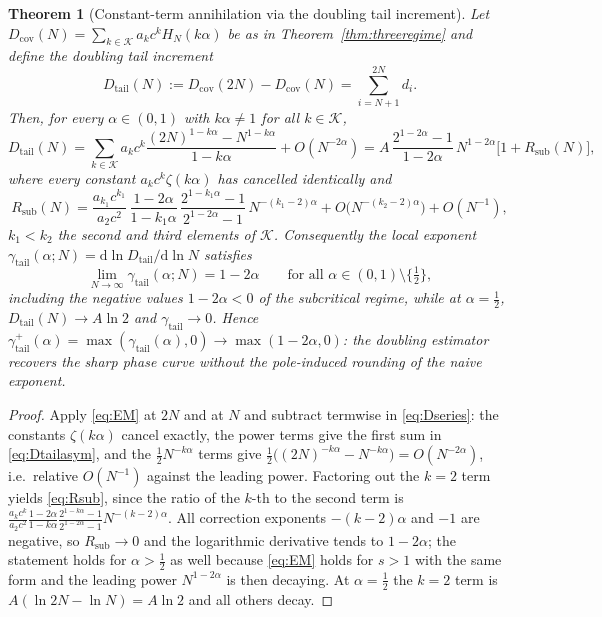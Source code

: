 \documentclass[11pt,reqno]{amsart}
\theoremstyle{plain}
\newtheorem{theorem}{Theorem}[section]
\theoremstyle{definition}
\theoremstyle{remark}
\numberwithin{equation}{section}
\newcommand{\dd}{\mathrm{d}}
\newcommand{\Dcov}{D_{\mathrm{cov}}}
\newcommand{\Dtail}{D_{\mathrm{tail}}}
\newcommand{\gtail}{\gamma_{\mathrm{tail}}}
\begin{document}
\begin{theorem}[Constant-term annihilation via the doubling tail increment]\label{thm:tail}
Let $\Dcov(N)=\sum_{k\in\mathcal K}a_kc^kH_N(k\alpha)$ be as in Theorem~\ref{thm:threeregime} and define the doubling tail increment
\begin{equation}\label{eq:Dtail}
\Dtail(N):=\Dcov(2N)-\Dcov(N)=\sum_{i=N+1}^{2N}d_i .
\end{equation}
Then, for every $\alpha\in(0,1)$ with $k\alpha\ne1$ for all $k\in\mathcal K$,
\begin{equation}\label{eq:Dtailasym}
\Dtail(N)=\sum_{k\in\mathcal K}a_kc^k\frac{(2N)^{1-k\alpha}-N^{1-k\alpha}}{1-k\alpha}+O(N^{-2\alpha})
=A\,\frac{2^{1-2\alpha}-1}{1-2\alpha}\,N^{1-2\alpha}\bigl[1+R_{\mathrm{sub}}(N)\bigr],
\end{equation}
where every constant $a_kc^k\zeta(k\alpha)$ has cancelled identically and
\begin{equation}\label{eq:Rsub}
R_{\mathrm{sub}}(N)=\frac{a_{k_1}c^{k_1}}{a_2c^2}\,\frac{1-2\alpha}{1-k_1\alpha}\,\frac{2^{1-k_1\alpha}-1}{2^{1-2\alpha}-1}\,N^{-(k_1-2)\alpha}+O\bigl(N^{-(k_2-2)\alpha}\bigr)+O(N^{-1}),
\end{equation}
$k_1<k_2$ the second and third elements of $\mathcal K$. Consequently the local exponent $\gtail(\alpha;N)=\dd\ln\Dtail/\dd\ln N$ satisfies
\begin{equation}\label{eq:gtaillimit}
\lim_{N\to\infty}\gtail(\alpha;N)=1-2\alpha\qquad\text{for all }\alpha\in(0,1)\setminus\{\tfrac12\},
\end{equation}
including the negative values $1-2\alpha<0$ of the subcritical regime, while at $\alpha=\tfrac12$, $\Dtail(N)\to A\ln2$ and $\gtail\to0$. Hence $\gtail^+(\alpha)=\max(\gtail(\alpha),0)\to\max(1-2\alpha,0)$: the doubling estimator recovers the sharp phase curve without the pole-induced rounding of the naive exponent.
\end{theorem}

\begin{proof}
Apply \eqref{eq:EM} at $2N$ and at $N$ and subtract termwise in \eqref{eq:Dseries}: the constants $\zeta(k\alpha)$ cancel exactly, the power terms give the first sum in \eqref{eq:Dtailasym}, and the $\frac12N^{-k\alpha}$ terms give $\frac12\bigl((2N)^{-k\alpha}-N^{-k\alpha}\bigr)=O(N^{-2\alpha})$, i.e.\ relative $O(N^{-1})$ against the leading power. Factoring out the $k=2$ term yields \eqref{eq:Rsub}, since the ratio of the $k$-th to the second term is $\frac{a_kc^k}{a_2c^2}\frac{1-2\alpha}{1-k\alpha}\frac{2^{1-k\alpha}-1}{2^{1-2\alpha}-1}N^{-(k-2)\alpha}$. All correction exponents $-(k-2)\alpha$ and $-1$ are negative, so $R_{\mathrm{sub}}\to0$ and the logarithmic derivative tends to $1-2\alpha$; the statement holds for $\alpha>\tfrac12$ as well because \eqref{eq:EM} holds for $s>1$ with the same form and the leading power $N^{1-2\alpha}$ is then decaying. At $\alpha=\tfrac12$ the $k=2$ term is $A(\ln2N-\ln N)=A\ln2$ and all others decay.
\end{proof}
\end{document}
